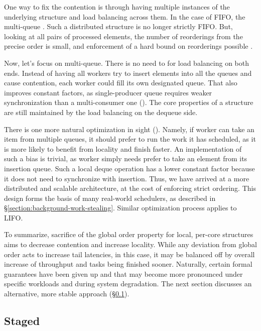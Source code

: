 \documentclass[12pt,a4paper,twoside]{report}
\begin{document}
One way to fix the contention is through having multiple instances of the underlying structure and load balancing across them. In the case of FIFO, the multi-queue \cite{Postnikova2022}. Such a distributed structure is no longer strictly FIFO. But, looking at all pairs of processed elements, the number of reorderings from the precise order is small, and enforcement of a hard bound on reorderings possible \cite{Kirsch2013}. 

Now, let's focus on multi-queue. There is no need to for load balancing on both ends. Instead of having all workers try to insert elements into all the queues and cause contention, each worker could fill its own designated queue. That also improves constant factors, as single-producer queue requires weaker synchronization than a multi-consumer one (). The core properties of a structure are still maintained by the load balancing on the dequeue side. 

There is one more natural optimization in sight (). Namely, if worker can take an item from multiple queues, it should prefer to run the work it has scheduled, as it is more likely to benefit from locality and finish faster. An implementation of such a bias is trivial, as worker simply needs prefer to take an element from its insertion queue. Such a local deque operation has a lower constant factor because it does not need to synchronize with insertion. Thus, we have arrived at a more distributed and scalable architecture, at the cost of enforcing strict ordering. This design forms the basis of many real-world schedulers, as described in \S\ref{section:background-work-stealing}. Similar optimization process applies to LIFO. 

To summarize, sacrifice of the global order property for local, per-core structures aims to decrease contention and increase locality. While any deviation from global order acts to increase tail latencies, in this case, it may be balanced off by overall increase of throughput and tasks being finished sooner. Naturally, certain formal guarantees have been given up and that may become more pronounced under specific workloads and during system degradation. The next section discusses an alternative, more stable approach (\S\ref{section:design-staged}).
    
\subsection{Staged}
\label{section:design-staged}
\end{document}
